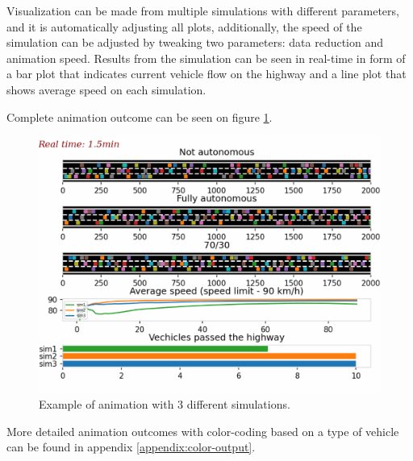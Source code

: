 Visualization can be made from multiple simulations with different parameters, and it is automatically adjusting all plots, additionally, the speed of the simulation can be adjusted by tweaking two parameters: data reduction and animation speed. Results from the simulation can be seen in real-time in form of a bar plot that indicates current vehicle flow on the highway and a line plot that shows average speed on each simulation. 

Complete animation outcome can be seen on figure \ref{fig:animtion}.
\begin{figure}[H]
    \centering
    \includegraphics[width=\linewidth]{images/sim-1.png}
    \caption{Example of animation with 3 different simulations.}
    \label{fig:animtion}
\end{figure}

More detailed animation outcomes with color-coding based on a type of vehicle can be found in appendix \ref{appendix:color-output}.
